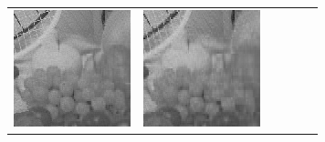 \documentclass[11pt,a4paper,openright,oneside]{book}
\numberwithin{equation}{section}
\begin{document}
{\begin{figure}[h]
\begin{adjustwidth}{-3cm}{-3cm}
\begin{tabular}{>{\centering\arraybackslash}m{1.5cm} m{2.5cm} m{2.5cm} m{2.5cm} m{2.5cm} m{2.5cm}}
        \includegraphics[width=\linewidth]{media/tnale/AAAfruits-comp3.png} & 
        \includegraphics[width=\linewidth]{media/tnale/AAAfruits-comp4.png} &

\end{tabular}
\end{adjustwidth}
\end{figure}}
\end{document}
